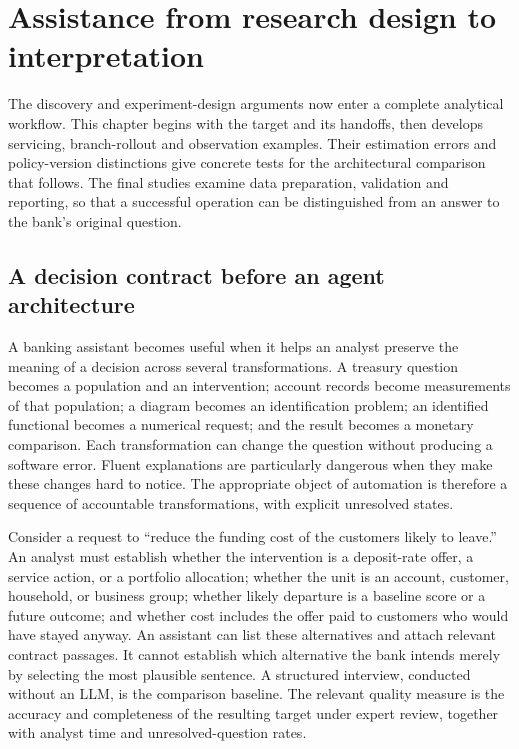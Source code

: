 \chapter{Assistance from research design to interpretation}
\label{ch:la04-workflow}

The discovery and experiment-design arguments now enter a complete analytical
workflow. This chapter begins with the target and its handoffs, then develops
servicing, branch-rollout and observation examples. Their estimation errors
and policy-version distinctions give concrete tests for the architectural
comparison that follows. The final studies examine data preparation,
validation and reporting, so that a successful operation can be distinguished
from an answer to the bank's original question.

\section{A decision contract before an agent architecture}

A banking assistant becomes useful when it helps an analyst preserve the meaning
of a decision across several transformations. A treasury question becomes a
population and an intervention; account records become measurements of that
population; a diagram becomes an identification problem; an identified
functional becomes a numerical request; and the result becomes a monetary
comparison. Each transformation can change the question without producing a
software error. Fluent explanations are particularly dangerous when they make
these changes hard to notice. The appropriate object of automation is therefore
a sequence of accountable transformations, with explicit unresolved states.

Consider a request to ``reduce the funding cost of the customers likely to
leave.'' An analyst must establish whether the intervention is a deposit-rate
offer, a service action, or a portfolio allocation; whether the unit is an
account, customer, household, or business group; whether likely departure is a
baseline score or a future outcome; and whether cost includes the offer paid to
customers who would have stayed anyway. An assistant can list these alternatives
and attach relevant contract passages. It cannot establish which alternative
the bank intends merely by selecting the most plausible sentence. A structured
interview, conducted without an LLM, is the comparison baseline. The relevant
quality measure is the accuracy and completeness of the resulting target under
expert review, together with analyst time and unresolved-question rates.

